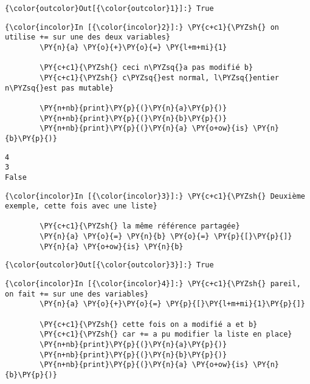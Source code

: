 \begin{Verbatim}[commandchars=\\\{\}]
{\color{outcolor}Out[{\color{outcolor}1}]:} True
\end{Verbatim}
            
    \begin{Verbatim}[commandchars=\\\{\}]
{\color{incolor}In [{\color{incolor}2}]:} \PY{c+c1}{\PYZsh{} on utilise += sur une des deux variables}
        \PY{n}{a} \PY{o}{+}\PY{o}{=} \PY{l+m+mi}{1}
        
        \PY{c+c1}{\PYZsh{} ceci n\PYZsq{}a pas modifié b}
        \PY{c+c1}{\PYZsh{} c\PYZsq{}est normal, l\PYZsq{}entier n\PYZsq{}est pas mutable}
        
        \PY{n+nb}{print}\PY{p}{(}\PY{n}{a}\PY{p}{)}
        \PY{n+nb}{print}\PY{p}{(}\PY{n}{b}\PY{p}{)}
        \PY{n+nb}{print}\PY{p}{(}\PY{n}{a} \PY{o+ow}{is} \PY{n}{b}\PY{p}{)}
\end{Verbatim}


    \begin{Verbatim}[commandchars=\\\{\}]
4
3
False

    \end{Verbatim}

    \begin{Verbatim}[commandchars=\\\{\}]
{\color{incolor}In [{\color{incolor}3}]:} \PY{c+c1}{\PYZsh{} Deuxième exemple, cette fois avec une liste}
        
        \PY{c+c1}{\PYZsh{} la même référence partagée}
        \PY{n}{a} \PY{o}{=} \PY{n}{b} \PY{o}{=} \PY{p}{[}\PY{p}{]}
        \PY{n}{a} \PY{o+ow}{is} \PY{n}{b}
\end{Verbatim}


\begin{Verbatim}[commandchars=\\\{\}]
{\color{outcolor}Out[{\color{outcolor}3}]:} True
\end{Verbatim}
            
    \begin{Verbatim}[commandchars=\\\{\}]
{\color{incolor}In [{\color{incolor}4}]:} \PY{c+c1}{\PYZsh{} pareil, on fait += sur une des variables}
        \PY{n}{a} \PY{o}{+}\PY{o}{=} \PY{p}{[}\PY{l+m+mi}{1}\PY{p}{]}
        
        \PY{c+c1}{\PYZsh{} cette fois on a modifié a et b}
        \PY{c+c1}{\PYZsh{} car += a pu modifier la liste en place}
        \PY{n+nb}{print}\PY{p}{(}\PY{n}{a}\PY{p}{)}
        \PY{n+nb}{print}\PY{p}{(}\PY{n}{b}\PY{p}{)}
        \PY{n+nb}{print}\PY{p}{(}\PY{n}{a} \PY{o+ow}{is} \PY{n}{b}\PY{p}{)}
\end{Verbatim}


